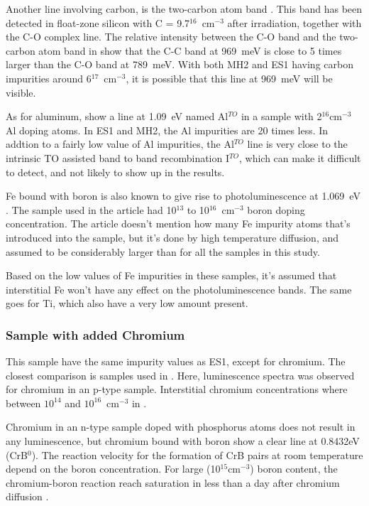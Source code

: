 Another line involving carbon, is the two-carbon atom band \cite{davies88}. This band has been detected in float-zone silicon with C = 9.7$^{16}$~cm$^{-3}$ after irradiation, together with the C-O complex line. The relative intensity between the C-O band and the two-carbon atom band in \cite{davies88} show that the C-C band at 969~meV is close to 5 times larger than the C-O band at 789~meV. With both MH2 and ES1 having carbon impurities around 6$^{17}$~cm$^{-3}$, it is possible that this line at 969~meV will be visible. 

As for aluminum, \cite{dean67} show a line at 1.09~eV named Al$^{TO}$ in a sample with 2$^{16}$cm$^{-3}$ Al doping atoms. In ES1 and MH2, the Al impurities are 20 times less. In addtion to a fairly low value of Al impurities, the Al$^{TO}$ line is very close to the intrinsic TO assisted band to band recombination I$^{TO}$, which can make it difficult to detect, and not likely to show up in the results.

Fe bound with boron is also known to give rise to photoluminescence at 1.069~eV \cite{mohring83}. The sample used in the article had  10$^{13}$ to 10$^{16}$~cm$^{-3}$ boron doping concentration. The article doesn't mention how many Fe impurity atoms that's introduced into the sample, but it's done by high temperature diffusion, and assumed to be considerably larger than for all the samples in this study. 

Based on the low values of Fe impurities in these samples, it's assumed that interstitial Fe won't have any effect on the photoluminescence bands. The same goes for Ti, which also have a very low amount present.


\subsubsection{Sample with added Chromium}

This sample have the same impurity values as ES1, except for chromium. The closest comparison is samples used in \cite{conzelmann82}. Here, luminescence spectra was observed for chromium in an p-type sample. Interstitial chromium concentrations where between $10^{14}$ and $10^{16} $~cm$^{-3}$ in \cite{conzelmann82}.

Chromium in an n-type sample doped with phosphorus atoms does not result in any luminescence, but chromium bound with boron show a clear line at 0.8432eV (CrB$^0$). The reaction velocity for the formation of CrB pairs at room temperature depend on the boron concentration. For large (10$^{15}$cm$^{-3}$) boron content, the chromium-boron reaction reach saturation in less than a day after chromium diffusion \cite{conzelmann82}.

